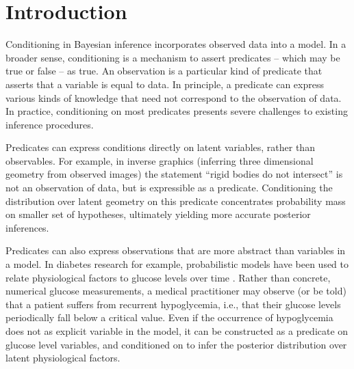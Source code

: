 
\section{Introduction}

Conditioning in Bayesian inference incorporates observed data into a model.
In a broader sense, conditioning is a mechanism to assert predicates -- which may be true or false -- as true.
An observation is a particular kind of predicate that asserts that a variable is equal to data.
In principle, a predicate can express various kinds of knowledge that need not correspond to the observation of data.
In practice, conditioning on most predicates presents severe challenges to existing inference procedures.


Predicates can express conditions directly on latent variables, rather than observables.
For example, in inverse graphics \cite{kulkarni2015deep} (inferring three dimensional geometry from observed images) the statement ``rigid bodies do not intersect'' is not an observation of data, but is expressible as a predicate.
Conditioning the distribution over latent geometry on this predicate concentrates probability mass on smaller set of hypotheses, ultimately yielding more accurate posterior inferences.

Predicates can also express observations that are more abstract than variables in a model.
In diabetes research for example, probabilistic models have been used to relate physiological factors to glucose levels over time \citep{levine2017offline,murata2004probabilistic}.
Rather than concrete, numerical glucose measurements, a medical practitioner may observe (or be told) that a patient suffers from recurrent hypoglycemia, i.e., that their glucose levels periodically fall below a critical value.
Even if the occurrence of hypoglycemia does not as explicit variable in the model, it can be constructed as a predicate on glucose level variables, and conditioned on to infer the posterior distribution over latent physiological factors.







